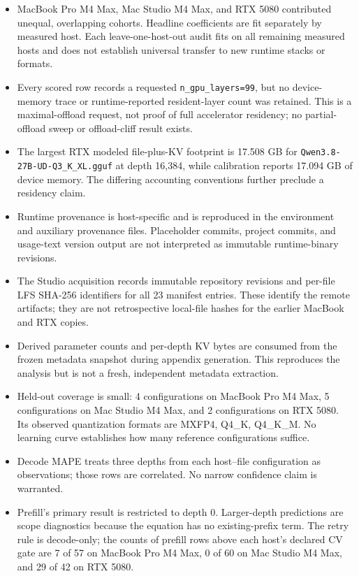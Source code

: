 \documentclass[10pt]{article}
\begin{document}
\begin{itemize}
\item MacBook Pro M4 Max, Mac Studio M4 Max, and RTX 5080 contributed unequal, overlapping cohorts. Headline coefficients are fit separately by measured host. Each leave-one-host-out audit fits on all remaining measured hosts and does not establish universal transfer to new runtime stacks or formats.
\item Every scored row records a requested \texttt{n\_gpu\_layers=99}, but no device-memory trace or runtime-reported resident-layer count was retained. This is a maximal-offload request, not proof of full accelerator residency; no partial-offload sweep or offload-cliff result exists.
\item The largest RTX modeled file-plus-KV footprint is 17.508 GB for \nolinkurl{Qwen3.8-27B-UD-Q3_K_XL.gguf} at depth 16,384, while calibration reports 17.094 GB of device memory. The differing accounting conventions further preclude a residency claim.
\item Runtime provenance is host-specific and is reproduced in the environment and auxiliary provenance files. Placeholder commits, project commits, and usage-text version output are not interpreted as immutable runtime-binary revisions.
\item The Studio acquisition records immutable repository revisions and per-file LFS SHA-256 identifiers for all 23 manifest entries. These identify the remote artifacts; they are not retrospective local-file hashes for the earlier MacBook and RTX copies.
\item Derived parameter counts and per-depth KV bytes are consumed from the frozen metadata snapshot during appendix generation. This reproduces the analysis but is not a fresh, independent metadata extraction.
\item Held-out coverage is small: 4 configurations on MacBook Pro M4 Max, 5 configurations on Mac Studio M4 Max, and 2 configurations on RTX 5080. Its observed quantization formats are MXFP4, Q4\_K, Q4\_K\_M. No learning curve establishes how many reference configurations suffice.
\item Decode MAPE treats three depths from each host--file configuration as observations; those rows are correlated. No narrow confidence claim is warranted.
\item Prefill's primary result is restricted to depth 0. Larger-depth predictions are scope diagnostics because the equation has no existing-prefix term. The retry rule is decode-only; the counts of prefill rows above each host's declared CV gate are 7 of 57 on MacBook Pro M4 Max, 0 of 60 on Mac Studio M4 Max, and 29 of 42 on RTX 5080.

\end{itemize}
\end{document}
